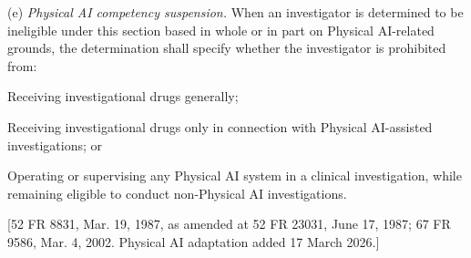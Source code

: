 (e) \textit{Physical AI competency suspension.} When an investigator is determined to be ineligible under this section based in whole or in part on Physical AI-related grounds, the determination shall specify whether the investigator is prohibited from:

\begin{description}[leftmargin=0.8cm,style=sameline]
\item[(i)] Receiving investigational drugs generally;
\item[(ii)] Receiving investigational drugs only in connection with Physical AI-assisted investigations; or
\item[(iii)] Operating or supervising any Physical AI system in a clinical investigation, while remaining eligible to conduct non-Physical AI investigations.
\end{description}

[52 FR 8831, Mar. 19, 1987, as amended at 52 FR 23031, June 17, 1987; 67 FR 9586, Mar. 4, 2002. Physical AI adaptation added 17 March 2026.]

